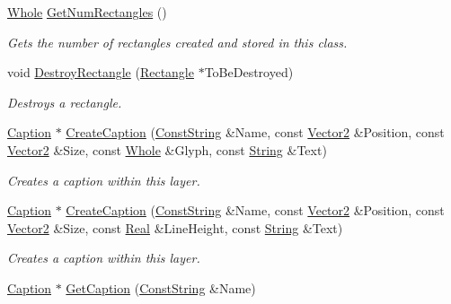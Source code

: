 \begin{DoxyCompactItemize}
\hyperlink{namespacephys_a460f6bc24c8dd347b05e0366ae34f34a}{Whole} \hyperlink{classphys_1_1UI_1_1Layer_a1a006c096c7eb87669f00cb6a385567e}{GetNumRectangles} ()
\begin{DoxyCompactList}\small\item\em Gets the number of rectangles created and stored in this class. \item\end{DoxyCompactList}\item 
void \hyperlink{classphys_1_1UI_1_1Layer_a8bfa08dad890a56e056054b09162cdf4}{DestroyRectangle} (\hyperlink{classphys_1_1UI_1_1Rectangle}{Rectangle} $\ast$ToBeDestroyed)
\begin{DoxyCompactList}\small\item\em Destroys a rectangle. \item\end{DoxyCompactList}\item 
\hyperlink{classphys_1_1UI_1_1Caption}{Caption} $\ast$ \hyperlink{classphys_1_1UI_1_1Layer_acdd3e11a5be126d58f9ca43d3f1d1e8f}{CreateCaption} (\hyperlink{namespacephys_a5ce5049f8b4bf88d6413c47b504ebb31}{ConstString} \&Name, const \hyperlink{classphys_1_1Vector2}{Vector2} \&Position, const \hyperlink{classphys_1_1Vector2}{Vector2} \&Size, const \hyperlink{namespacephys_a460f6bc24c8dd347b05e0366ae34f34a}{Whole} \&Glyph, const \hyperlink{namespacephys_aa03900411993de7fbfec4789bc1d392e}{String} \&Text)
\begin{DoxyCompactList}\small\item\em Creates a caption within this layer. \item\end{DoxyCompactList}\item 
\hyperlink{classphys_1_1UI_1_1Caption}{Caption} $\ast$ \hyperlink{classphys_1_1UI_1_1Layer_a65fc6e261069c8bf594c844bc66bd5e4}{CreateCaption} (\hyperlink{namespacephys_a5ce5049f8b4bf88d6413c47b504ebb31}{ConstString} \&Name, const \hyperlink{classphys_1_1Vector2}{Vector2} \&Position, const \hyperlink{classphys_1_1Vector2}{Vector2} \&Size, const \hyperlink{namespacephys_af7eb897198d265b8e868f45240230d5f}{Real} \&LineHeight, const \hyperlink{namespacephys_aa03900411993de7fbfec4789bc1d392e}{String} \&Text)
\begin{DoxyCompactList}\small\item\em Creates a caption within this layer. \item\end{DoxyCompactList}\item 
\hyperlink{classphys_1_1UI_1_1Caption}{Caption} $\ast$ \hyperlink{classphys_1_1UI_1_1Layer_af2dd8dc0a5b8775f069b98ce36ce9af6}{GetCaption} (\hyperlink{namespacephys_a5ce5049f8b4bf88d6413c47b504ebb31}{ConstString} \&Name)

\end{DoxyCompactItemize}

